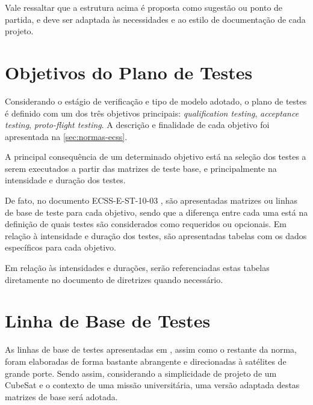 Vale ressaltar que a estrutura acima é proposta como sugestão ou ponto de partida, e deve ser adaptada às necessidades e ao estilo de documentação de cada projeto.


\section{Objetivos do Plano de Testes} \label{sec:objetivo-testes}


Considerando o estágio de verificação e tipo de modelo adotado, o plano de testes é definido com um dos três objetivos principais: \textit{qualification testing}, \textit{acceptance testing}, \textit{proto-flight testing}.
A descrição e finalidade de cada objetivo foi apresentada na \autoref{sec:normas-ecss}.

A principal consequência de um determinado objetivo está na seleção dos testes a serem executados a partir das matrizes de teste base, e principalmente na intensidade e duração dos testes.

De fato, no documento ECSS-E-ST-10-03 \cite{ecss-e-st-10-03}, são apresentadas matrizes ou linhas de base de teste para cada objetivo, sendo que a diferença entre cada uma está na definição de quais testes são considerados como requeridos ou opcionais.
Em relação à intensidade e duração dos testes, são apresentadas tabelas com os dados específicos para cada objetivo.

Em relação às intensidades e durações, serão referenciadas estas tabelas diretamente no documento de diretrizes quando necessário.






\section{Linha de Base de Testes} \label{sec:linhas-base}

As linhas de base de testes apresentadas em \textcite{ecss-e-st-10-03}, assim como o restante da norma, foram elaboradas de forma bastante abrangente e direcionadas à satélites de grande porte.
Sendo assim, considerando a simplicidade de projeto de um CubeSat e o contexto de uma missão universitária, uma versão adaptada destas matrizes de base será adotada.

